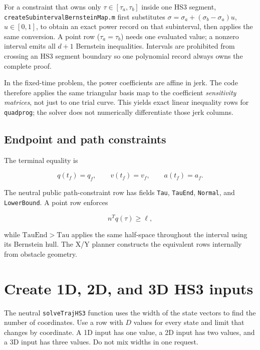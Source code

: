 \documentclass[10pt,letterpaper]{article}
\newcommand{\file}[1]{\nolinkurl{#1}}
\begin{document}
For a constraint that owns only $\tau\in[\tau_a,\tau_b]$ inside one HS3
segment, \file{createSubintervalBernsteinMap.m} first substitutes
$\sigma=\sigma_a+(\sigma_b-\sigma_a)u$, $u\in[0,1]$, to obtain an exact power
record on that subinterval, then applies the same conversion. A point row
($\tau_a=\tau_b$) needs one evaluated value; a nonzero interval emits all
$d+1$ Bernstein inequalities. Intervals are prohibited from crossing an HS3
segment boundary so one polynomial record always owns the complete proof.

In the fixed-time problem, the power coefficients are affine in jerk. The code
therefore applies the same triangular basis map to the coefficient
\emph{sensitivity matrices}, not just to one trial curve. This yields exact
linear inequality rows for \file{quadprog}; the solver does not numerically
differentiate those jerk columns.

\subsection{Endpoint and path constraints}

The terminal equality is

\begin{equation}
q(t_f)=q_f,\qquad v(t_f)=v_f,\qquad a(t_f)=a_f.
\end{equation}

The neutral public path-constraint row has fields
\file{Tau}, \file{TauEnd}, \file{Normal}, and \file{LowerBound}. A point row
enforces

\begin{equation}\label{eq:pathrow}
n^T q(\tau)\ge \ell,
\end{equation}

while $\mathrm{TauEnd}>\mathrm{Tau}$ applies the same half-space throughout the
interval using its Bernstein hull. The X/Y planner constructs the equivalent
rows internally from obstacle geometry.

\section{Create 1D, 2D, and 3D HS3 inputs}\label{sec:dimensionexamples}

The neutral \file{solveTrajHS3} function uses the width of the state vectors to
find the number of coordinates. Use a row with $D$ values for every state and
limit that changes by coordinate. A 1D input has one value, a 2D input has two
values, and a 3D input has three values. Do not mix widths in one request.
\end{document}
